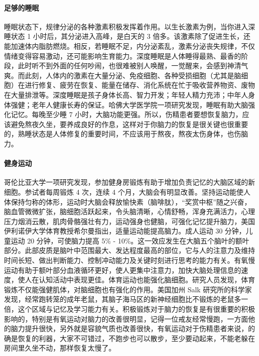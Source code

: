 \paragraph{足够的睡眠} 睡眠状态下，规律分泌的各种激素积极发挥着作用。以生长激素为例，当你进入深睡状态 1 小时后，其分泌进入高峰，是白天的 3 倍多。该激素除了促进生长，还能加速体内脂肪燃烧。相反，若睡眠不足，内分泌紊乱，激素分泌丧失规律，不仅情绪变得容易激动，还可能影响生育能力。深度睡眠是人体睡得最熟、最香的阶段，此时听不到外面的任何吵闹，也很难被别人唤醒，一觉醒来，会感到神清气爽。而此刻，人体内的激素在大量分泌、免疫细胞、各种受损细胞（尤其是脑细胞）在进行修复、疲劳在恢复、能量在储存、消化系统在忙于吸收营养物资、废物在大量排泄等。深度睡眠是孩子身体长高、智力开发；年轻人精力充沛；中年人身体强健；老年人健康长寿的保证。哈佛大学医学院一项研究发现，睡眠有助大脑强化记忆。每晚至少睡 7 小时，大脑功能更强。所以，伤精患者要想恢复脑力，应该避免熬夜久坐，要养成良好的作息，这样对于你脑力的恢复是很关键也很重要的，熟睡状态是人体修复的重要时间，不应该用于熬夜，熬夜太伤身体，也伤脑力。

\paragraph{健身运动} 哥伦比亚大学一项研究发现，参加健身房锻炼有助于增加负责记忆的大脑区域的新细胞。参试者每周锻炼 4 次，连续 4 个月，大脑会有明显改善。坚持运动能使人体保持匀称的体形，运动时大脑会释放愉快素（脑啡肽），“奖赏中枢”随之兴奋，脑血管微微扩张，脑细胞活跃起来，令头脑清晰，心情舒畅，浑身充满活力，心理压力烟消云散，肌肉骨骼强壮有力，运动强身也健脑，可强化记忆提升脑力，美国伊利诺伊大学体育教授希尔曼指出，适量运动能提高脑力。成人运动 30 分钟，儿童运动 20 分钟，可使脑力提高 5\% - 10\%。这一效应发生在大脑五个脑叶的额叶部分。此部皮质是脑叶中范围最大、发达程度最高的部位，它与人的注意力及维持时间长短、做出判断能力、控制冲动能力及关键时刻进行思考的能力有关。有氧慢运动有助于额叶部分血液循环更好，使人更集中注意力，加快大脑处理信息的速度，使人在认知活动中表现更佳。体育运动也能强化脑细胞。研究人员发现，体育锻炼不仅能强健肌体，对脑细胞也有强化的作用。美国加州 Salk 研究所的科学家发现，经常跑转笼的成年老鼠，其脑子海马区的新神经细胞比不锻炼的老鼠多一倍，这个区域与记忆及学习能力有关。积极锻炼对于脑力的恢复是有很重要的积极影响的，特别是有氧运动对脑力的改善很明显，记得一位戒友经常慢跑，一方面他的脑力提升很快，另外就是容貌气质也改善很快，有氧运动对于伤精患者来说，的确是恢复的利器，大家不可错过，不跑步也可以散步，至少要动起来，不能老躲在房间里久坐不动，那样恢复太慢了。

